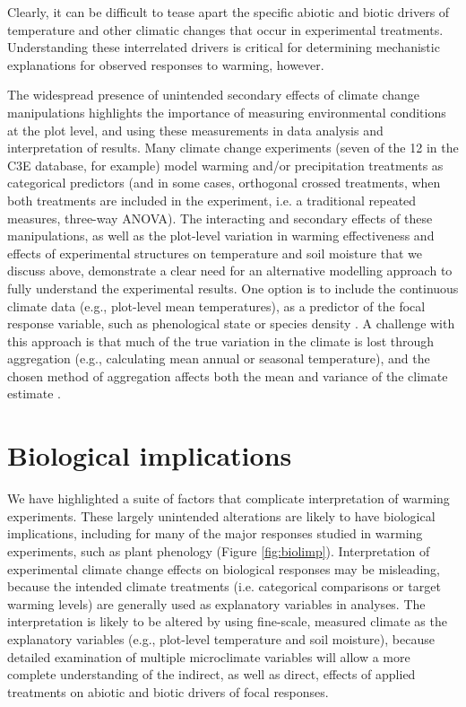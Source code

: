 \documentclass{article}
\begin{document}
Clearly, it can be difficult to tease apart the specific abiotic and biotic drivers of temperature and other climatic changes that occur in experimental treatments. Understanding these interrelated drivers is critical for determining mechanistic explanations for observed responses to warming, however. 
\par The widespread presence of unintended secondary effects of climate change manipulations highlights the importance of measuring environmental conditions at the plot level, and using these measurements in data analysis and interpretation of results. Many climate change experiments (seven of the 12 in the C3E database, for example) model warming and/or precipitation treatments as categorical predictors (and in some cases, orthogonal crossed treatments, when both treatments are included in the experiment, i.e. a traditional repeated measures, three-way ANOVA). The interacting and secondary effects of these manipulations, as well as the plot-level variation in warming effectiveness and effects of experimental structures on temperature and soil moisture that we discuss above, demonstrate a clear need for an alternative modelling approach to fully understand the experimental results. One option is to include the continuous climate data (e.g., plot-level mean temperatures), as a predictor of the focal response variable, such as phenological state or species density \citep [e.g.,][]{marchin2015, pelini2014}. A challenge with this approach is that much of the true variation in the climate is lost through aggregation (e.g., calculating mean annual or seasonal temperature), and the chosen method of aggregation affects both the mean and variance of the climate estimate \citep [e.g.,][]{clark2014b}. 

\section* {Biological implications}

\par We have highlighted a suite of factors that complicate interpretation of warming experiments. These largely unintended alterations are likely to have biological implications, including for many of the major responses studied in warming experiments, such as plant phenology (Figure \ref{fig:biolimp}). Interpretation of experimental climate change effects on biological responses may be misleading, because the intended climate treatments (i.e. categorical comparisons or target warming levels) are generally used as explanatory variables in analyses. The interpretation is likely to be altered by using fine-scale, measured climate as the explanatory variables (e.g., plot-level temperature and soil moisture), because detailed examination of multiple microclimate variables will allow a more complete understanding of the indirect, as well as direct, effects of applied treatments on abiotic and biotic drivers of focal responses.
\end{document}
